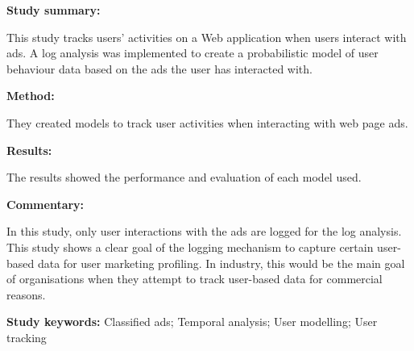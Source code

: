 \begin{tcolorbox}[colback=gray!5!white, colframe=pastelgreen!40!black, title=Tracking User Activities and Marketplace Dynamics in Classified Ads\cite{Waqar2017}]
	\begin{minipage}[t]{0.25\textwidth}
		\textbf{Study summary:}
	\end{minipage}
	\hfill
	\begin{minipage}[t]{0.65\textwidth}
		This study tracks users' activities on a Web application when users interact with ads. A log
		analysis was implemented to create a probabilistic model of user behaviour data based on the
		ads the user has interacted with.
	\end{minipage}

	\vspace{0.75em} 

	\begin{minipage}[t]{0.25\textwidth}
		\textbf{Method:}
	\end{minipage}
	\hfill
	\begin{minipage}[t]{0.65\textwidth}
		They created models to track user activities when interacting with web page ads.
	\end{minipage}

	\vspace{0.75em} 

	\begin{minipage}[t]{0.25\textwidth}
		\textbf{Results:}
	\end{minipage}
	\hfill
	\begin{minipage}[t]{0.65\textwidth}
		The results showed the performance and evaluation of each model used.
	\end{minipage}

	\vspace{0.75em} 

	\begin{minipage}[t]{0.25\textwidth}
		\textbf{Commentary:}
	\end{minipage}
	\hfill
	\begin{minipage}[t]{0.65\textwidth}
		In this study, only user interactions with the ads are logged for the log analysis. This
		study shows a clear goal of the logging mechanism to capture certain user-based data for
		user marketing profiling. In industry, this would be the main goal of organisations when
		they attempt to track user-based data for commercial reasons.
	\end{minipage}
	\tcblower
	\textbf{Study keywords:} Classified ads; Temporal analysis; User modelling; User tracking
\end{tcolorbox}

